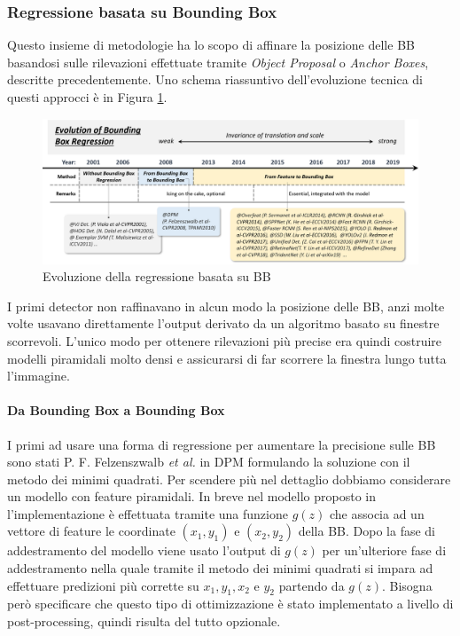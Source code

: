 \subsubsection{Regressione basata su Bounding Box}
Questo insieme di metodologie ha lo scopo di affinare la posizione delle \ac{BB} basandosi sulle rilevazioni effettuate tramite \textit{Object Proposal} o \textit{Anchor Boxes}, descritte precedentemente. Uno schema riassuntivo dell'evoluzione tecnica di questi approcci è in Figura \ref{fig:bbox_history}.
\begin{figure}
    \centering
    \includegraphics[width=\textwidth]{images/evol-bbreg.png}
    \caption{Evoluzione della regressione basata su \ac{BB} \cite{DBLP:journals/corr/abs-1905-05055}}
    \label{fig:bbox_history}
\end{figure}

I primi detector non raffinavano in alcun modo la posizione delle \ac{BB}, anzi molte volte usavano direttamente l'output derivato da un algoritmo basato su finestre scorrevoli. L'unico modo per ottenere rilevazioni più precise era quindi costruire modelli piramidali molto densi e assicurarsi di far scorrere la finestra lungo tutta l'immagine.
\paragraph{Da Bounding Box a Bounding Box}
I primi ad usare una forma di regressione per aumentare la precisione sulle \ac{BB} sono stati P. F. Felzenszwalb \textit{et al.} in DPM \cite{5255236} formulando la soluzione con il metodo dei minimi quadrati. Per scendere più nel dettaglio dobbiamo considerare un modello con feature piramidali.
In breve nel modello proposto in \cite{5255236} l'implementazione è effettuata tramite una funzione $g(z)$ che associa ad un vettore di feature le coordinate $(x_1, y_1)$ e $(x_2, y_2)$ della \ac{BB}. Dopo la fase di addestramento del modello viene usato l'output di $g(z)$ per un'ulteriore fase di addestramento nella quale tramite il metodo dei minimi quadrati si impara ad effettuare predizioni più corrette su $x_1, y_1, x_2 \text{ e } y_2$ partendo da $g(z)$. Bisogna però specificare che questo tipo di ottimizzazione è stato implementato a livello di post-processing, quindi risulta del tutto opzionale.
